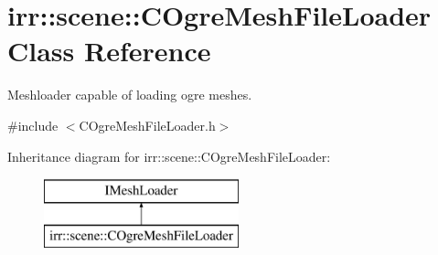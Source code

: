 \hypertarget{classirr_1_1scene_1_1_c_ogre_mesh_file_loader}{\section{irr\-:\-:scene\-:\-:C\-Ogre\-Mesh\-File\-Loader Class Reference}
\label{classirr_1_1scene_1_1_c_ogre_mesh_file_loader}
}


Meshloader capable of loading ogre meshes.  




{\ttfamily \#include $<$C\-Ogre\-Mesh\-File\-Loader.\-h$>$}

Inheritance diagram for irr\-:\-:scene\-:\-:C\-Ogre\-Mesh\-File\-Loader\-:\begin{figure}[H]
\begin{center}
\leavevmode
\includegraphics[height=2.000000cm]{classirr_1_1scene_1_1_c_ogre_mesh_file_loader}
\end{center}
\end{figure}
